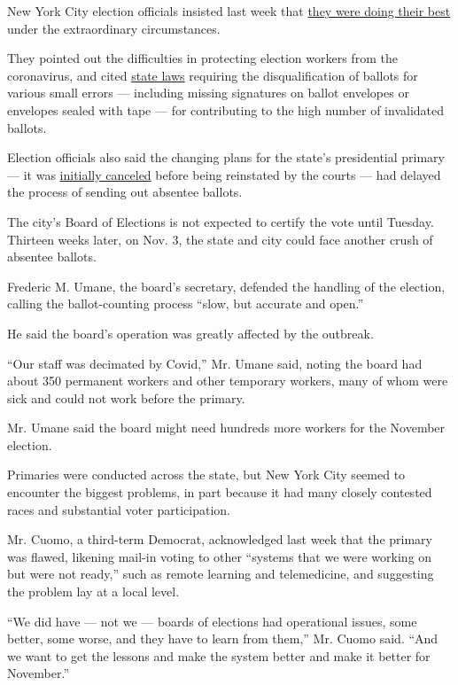 New York City election officials insisted last week that
\href{https://www.nytimes3xbfgragh.onion/2020/07/17/nyregion/election-absentee-ballots-primary.html}{they
were doing their best} under the extraordinary circumstances.

They pointed out the difficulties in protecting election workers from
the coronavirus, and cited
\href{https://www.nysenate.gov/legislation/laws/ELN/9-209}{state laws}
requiring the disqualification of ballots for various small errors ---
including missing signatures on ballot envelopes or envelopes sealed
with tape --- for contributing to the high number of invalidated
ballots.

Election officials also said the changing plans for the state's
presidential primary --- it was
\href{https://www.nytimes3xbfgragh.onion/2020/04/27/us/politics/democratic-primary-canceled-coronavirus.html}{initially
canceled} before being reinstated by the courts --- had delayed the
process of sending out absentee ballots.

The city's Board of Elections is not expected to certify the vote until
Tuesday. Thirteen weeks later, on Nov. 3, the state and city could face
another crush of absentee ballots.

Frederic M. Umane, the board's secretary, defended the handling of the
election, calling the ballot-counting process ``slow, but accurate and
open.''

He said the board's operation was greatly affected by the outbreak.

``Our staff was decimated by Covid,'' Mr. Umane said, noting the board
had about 350 permanent workers and other temporary workers, many of
whom were sick and could not work before the primary.

Mr. Umane said the board might need hundreds more workers for the
November election.

Primaries were conducted across the state, but New York City seemed to
encounter the biggest problems, in part because it had many closely
contested races and substantial voter participation.

Mr. Cuomo, a third-term Democrat, acknowledged last week that the
primary was flawed, likening mail-in voting to other ``systems that we
were working on but were not ready,'' such as remote learning and
telemedicine, and suggesting the problem lay at a local level.

``We did have --- not we --- boards of elections had operational issues,
some better, some worse, and they have to learn from them,'' Mr. Cuomo
said. ``And we want to get the lessons and make the system better and
make it better for November.''

